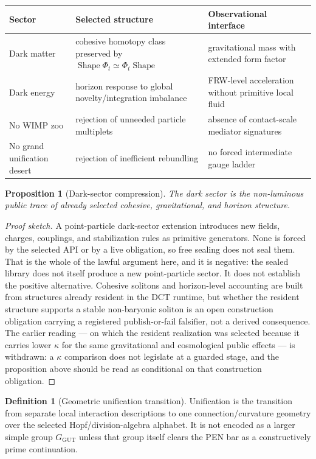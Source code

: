 \documentclass[11pt]{article}
\theoremstyle{plain}
\newtheorem{proposition}[theorem]{Proposition}
\theoremstyle{definition}
\newtheorem{definition}[theorem]{Definition}
\theoremstyle{remark}
\newenvironment{proofsketch}{\begin{proof}[Proof sketch]}{\end{proof}}
\newcommand{\Shape}{\operatorname{Shape}}
\begin{document}
\begin{center}
\small
\begin{tabularx}{\textwidth}{l Y Y}
\toprule
Sector & Selected structure & Observational interface \\
\midrule
Dark matter & cohesive homotopy class preserved by \(\Shape\Phi_t\simeq\Phi_t\Shape\) & gravitational mass with extended form factor \\
Dark energy & horizon response to global novelty/integration imbalance & FRW-level acceleration without primitive local fluid \\
No WIMP zoo & rejection of unneeded particle multiplets & absence of contact-scale mediator signatures \\
No grand unification desert & rejection of inefficient rebundling & no forced intermediate gauge ladder \\
\bottomrule
\end{tabularx}
\end{center}

\begin{proposition}[Dark-sector compression]
The dark sector is the non-luminous public trace of already selected cohesive, gravitational, and horizon structure.
\end{proposition}

\begin{proofsketch}
A point-particle dark-sector extension introduces new fields, charges, couplings, and stabilization rules as primitive generators. None is forced by the selected API or by a live obligation, so free sealing does not seal them. That is the whole of the lawful argument here, and it is negative: the sealed library does not itself produce a new point-particle sector. It does not establish the positive alternative. Cohesive solitons and horizon-level accounting are built from structures already resident in the DCT runtime, but whether the resident structure supports a stable non-baryonic soliton is an open construction obligation carrying a registered publish-or-fail falsifier, not a derived consequence. The earlier reading --- on which the resident realization was selected because it carries lower \(\kappa\) for the same gravitational and cosmological public effects --- is withdrawn: a \(\kappa\) comparison does not legislate at a guarded stage, and the proposition above should be read as conditional on that construction obligation.
\end{proofsketch}

\begin{definition}[Geometric unification transition]
Unification is the transition from separate local interaction descriptions to one connection/curvature geometry over the selected Hopf/division-algebra alphabet. It is not encoded as a larger simple group \(G_{\mathrm{GUT}}\) unless that group itself clears the PEN bar as a constructively prime continuation.
\end{definition}
\end{document}
